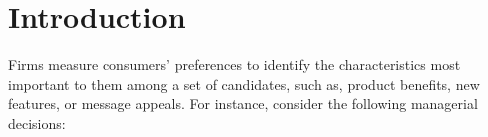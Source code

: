\documentclass[nonblindrev]{informs3}
\begin{document}
%


\newpage


\section{Introduction}

Firms measure consumers' preferences to identify the characteristics most important to them among a set of candidates, such as, product benefits, new features, or message appeals. For instance, consider the following managerial decisions:
\end{document}
